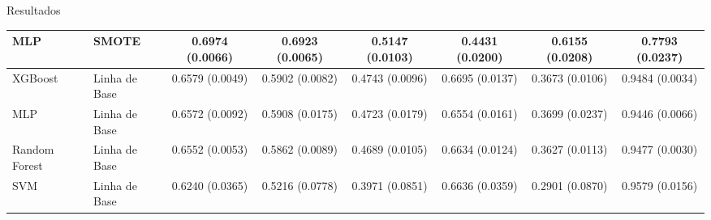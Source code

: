 \begin{frame}{Resultados}
\begin{table}[h]
{\begin{tabular}{|l|l|c|c|c|c|c|c|}
        \hline
        MLP & SMOTE & 0.6974 (0.0066) & 0.6923 (0.0065) & 0.5147 (0.0103) & 0.4431 (0.0200) & 0.6155 (0.0208) & 0.7793 (0.0237) \\
        \hline
        XGBoost & Linha de Base & 0.6579 (0.0049) & 0.5902 (0.0082) & 0.4743 (0.0096) & 0.6695 (0.0137) & 0.3673 (0.0106) & 0.9484 (0.0034) \\
        \hline
        MLP & Linha de Base & 0.6572 (0.0092) & 0.5908 (0.0175) & 0.4723 (0.0179) & 0.6554 (0.0161) & 0.3699 (0.0237) & 0.9446 (0.0066) \\
        \hline
        Random Forest & Linha de Base & 0.6552 (0.0053) & 0.5862 (0.0089) & 0.4689 (0.0105) & 0.6634 (0.0124) & 0.3627 (0.0113) & 0.9477 (0.0030) \\
        \hline
        SVM & Linha de Base & 0.6240 (0.0365) & 0.5216 (0.0778) & 0.3971 (0.0851) & 0.6636 (0.0359) & 0.2901 (0.0870) & 0.9579 (0.0156) \\
        \hline
      \end{tabular}%
    }
  \end{table}
  \normalsize
\end{frame}

